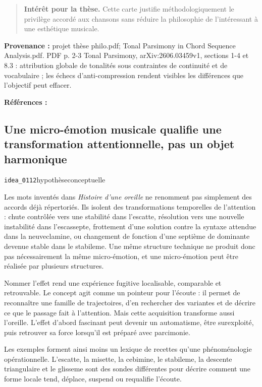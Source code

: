 \documentclass[10pt,a4paper]{article}
\begin{document}
\begin{quote}
\textbf{Intérêt pour la thèse.} Cette carte justifie méthodologiquement le privilège accordé aux chansons sans réduire la philosophie de l'intéressant à une esthétique musicale.
\end{quote}
{\footnotesize\color{metadata}\textbf{Provenance :} projet thèse philo.pdf; Tonal Parsimony in Chord Sequence Analysis.pdf. PDF p. 2-3 Tonal Parsimony, arXiv:2606.03459v1, sections 1-4 et 8.3 : attribution globale de tonalités sous contraintes de continuité et de vocabulaire ; les échecs d'anti-compression rendent visibles les différences que l'objectif peut effacer.\par}
{\footnotesize\color{metadata}\textbf{Références :} \parencite{pachet2026tonalparsimony}\par}

\subsection{Une micro-émotion musicale qualifie une transformation attentionnelle, pas un objet harmonique}
{\small\color{metadata} \texttt{idea\_0112}\quad\textbullet\quad hypothèse\quad\textbullet\quad conceptuelle\par}

Les mots inventés dans \emph{Histoire d'une oreille} ne renomment pas simplement des accords déjà répertoriés. Ils isolent des transformations temporelles de l'attention : chute contrôlée vers une stabilité dans l'escatte, résolution vers une nouvelle instabilité dans l'escassepte, frottement d'une solution contre la syntaxe attendue dans la neuveclamine, ou changement de fonction d'une septième de dominante devenue stable dans le stabileme. Une même structure technique ne produit donc pas nécessairement la même micro-émotion, et une micro-émotion peut être réalisée par plusieurs structures.

Nommer l'effet rend une expérience fugitive localisable, comparable et retrouvable. Le concept agit comme un pointeur pour l'écoute : il permet de reconnaître une famille de trajectoires, d'en rechercher des variantes et de décrire ce que le passage fait à l'attention. Mais cette acquisition transforme aussi l'oreille. L'effet d'abord fascinant peut devenir un automatisme, être surexploité, puis retrouver sa force lorsqu'il est préparé avec parcimonie.

Les exemples forment ainsi moins un lexique de recettes qu'une phénoménologie opérationnelle. L'escatte, la misette, la cebimine, le stabileme, la descente triangulaire et le glisseme sont des sondes différentes pour décrire comment une forme locale tend, déplace, suspend ou requalifie l'écoute.
\end{document}
